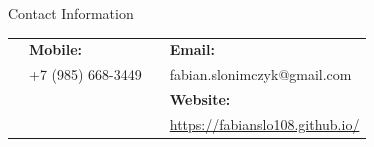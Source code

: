 

\begin{rubric}{Contact Information}

\begin{tabular}{p{0.7cm}lp{0.8cm}l}
&\textbf{Mobile:} && \textbf{Email:}\\
& +7 (985) 668-3449 && fabian.slonimczyk@gmail.com \\
&  && \textbf{Website:} \\
&  && \url{https://fabianslo108.github.io/}\\
\end{tabular}

\end{rubric}
